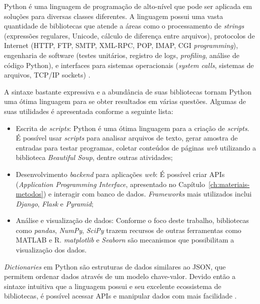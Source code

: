 Python é uma linguagem de programação de alto-nível que pode ser aplicada em soluções para diversas classes diferentes. A linguagem possui uma vasta quantidade de bibliotecas que atende a áreas como o processamento de \textit{strings} (expressões regulares, Unicode, cálculo de diferença entre arquivos), protocolos de Internet (HTTP, FTP, SMTP, XML-RPC, POP, IMAP, CGI \textit{programming}), engenharia de software (testes unitários, registro de logs, \textit{profiling}, análise de código Python), e interfaces para sistemas operacionais (\textit{system calls}, sistemas de arquivos, TCP/IP sockets) \cite{python-doc}.

A sintaxe bastante expressiva e a abundância de suas bibliotecas tornam Python uma ótima linguagem para se obter resultados em várias questões. Algumas de suas utilidades é apresentada conforme a seguinte lista:

\begin{itemize}
	\item Escrita de \textit{scripts}: Python é uma ótima linguagem para a criação de \textit{scripts}. É possível usar \textit{scripts} para analisar arquivos de texto, gerar amostra de entradas para testar programas, coletar conteúdos de páginas \textit{web} utilizando a biblioteca \textit{Beautiful Soup}, dentre outras atividades;
	\item Desenvolvimento \textit{backend} para aplicações \textit{web}: É possível criar APIs (\textit{Application Programming Interface}, apresentado no Capítulo~\ref{ch:materiais-metodos}) e interagir com banco de dados. \textit{Frameworks} mais utilizados inclui \textit{Django}, \textit{Flask} e \textit{Pyramid};
	\item Análise e visualização de dados: Conforme o foco deste trabalho, bibliotecas como \textit{pandas}, \textit{NumPy}, \textit{SciPy} trazem recursos de outras ferramentas como MATLAB e R. \textit{matplotlib} e \textit{Seaborn} são mecanismos que possibilitam a visualização dos dados.
\end{itemize}

\textit{Dictionaries} em Python são estruturas de dados similares ao JSON, que permitem ordenar dados através de um modelo chave-valor. Devido então a sintaxe intuitiva que a linguagem possui e seu excelente ecossistema de bibliotecas, é possível acessar APIs e manipular dados com mais facilidade \cite{mining-social-web}. 












